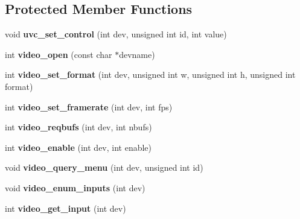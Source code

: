 \subsection*{\-Protected \-Member \-Functions}
\begin{DoxyCompactItemize}
\item 
\hypertarget{classUVCVideo_a52552afe548c906d0586261bce887de9}{void {\bfseries uvc\-\_\-set\-\_\-control} (int dev, unsigned int id, int value)}\label{classUVCVideo_a52552afe548c906d0586261bce887de9}

\item 
\hypertarget{classUVCVideo_a0964e8fc0baa6949c0bbf4b8efd994ff}{int {\bfseries video\-\_\-open} (const char $\ast$devname)}\label{classUVCVideo_a0964e8fc0baa6949c0bbf4b8efd994ff}

\item 
\hypertarget{classUVCVideo_a94997c6af5cc6330bec4d6a2902f39f6}{int {\bfseries video\-\_\-set\-\_\-format} (int dev, unsigned int w, unsigned int h, unsigned int format)}\label{classUVCVideo_a94997c6af5cc6330bec4d6a2902f39f6}

\item 
\hypertarget{classUVCVideo_ad32f1e626a1db3e4f4b6cd164a0512f2}{int {\bfseries video\-\_\-set\-\_\-framerate} (int dev, int fps)}\label{classUVCVideo_ad32f1e626a1db3e4f4b6cd164a0512f2}

\item 
\hypertarget{classUVCVideo_a132d4e99f6018a27111e09d84238931c}{int {\bfseries video\-\_\-reqbufs} (int dev, int nbufs)}\label{classUVCVideo_a132d4e99f6018a27111e09d84238931c}

\item 
\hypertarget{classUVCVideo_ab68ed6053c4d9b1d1e69bfc4fb361bd0}{int {\bfseries video\-\_\-enable} (int dev, int enable)}\label{classUVCVideo_ab68ed6053c4d9b1d1e69bfc4fb361bd0}

\item 
\hypertarget{classUVCVideo_a13a17978d4b51363f6afbcbe2c554b0f}{void {\bfseries video\-\_\-query\-\_\-menu} (int dev, unsigned int id)}\label{classUVCVideo_a13a17978d4b51363f6afbcbe2c554b0f}

\item 
\hypertarget{classUVCVideo_a155aef393c73a2db06b773aea2dbf21e}{void {\bfseries video\-\_\-enum\-\_\-inputs} (int dev)}\label{classUVCVideo_a155aef393c73a2db06b773aea2dbf21e}

\item 
\hypertarget{classUVCVideo_a2c5d1ee9051d61b1c03b0b40f36c972c}{int {\bfseries video\-\_\-get\-\_\-input} (int dev)}\label{classUVCVideo_a2c5d1ee9051d61b1c03b0b40f36c972c}


\end{DoxyCompactItemize}
